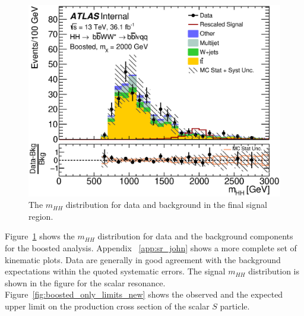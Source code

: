 




\begin{figure}[h]
\begin{center}
\includegraphics[scale=0.65]{figures/C_2tag_SR_lepton_presel_met50_hhMassRebin1}
\caption{The ${m_{HH}}$ distribution for data and background in the final signal region.}
\label{fig:fully_boost_mhh}
\end{center}
\end{figure}


Figure~\ref{fig:fully_boost_mhh} shows the $m_{HH}$ distribution for
data and the background components for the boosted analysis. Appendix ~\ref{app:sr_john} shows a more complete set of kinematic plots. 
Data are generally in good agreement with the background expectations within the quoted systematic errors.
The signal $m_{HH}$ distribution is shown in the figure for  the scalar resonance.
Figure~\ref{fig:boosted_only_limits_new} shows the observed and the expected
upper limit on the production cross section of the scalar $S$ particle.

